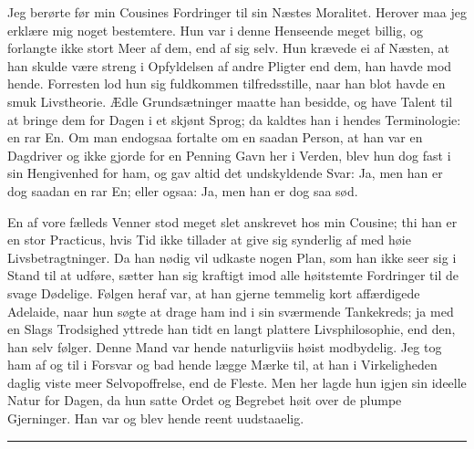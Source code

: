 \documentclass[12pt]{article}
\newcommand{\opage}[1]{\marginnote{\footnotesize\textit{[#1]}}}
\newcommand{\qvbreak}{\par\medskip\begin{center}\rule{0.32\textwidth}{0.4pt}\end{center}\medskip}
\begin{document}
Jeg berørte før min Cousines Fordringer til sin Næstes Moralitet. Herover maa jeg
erklære mig noget bestemtere. Hun var i denne Henseende meget billig, og
forlangte ikke stort Meer af dem, end af sig selv. Hun krævede ei af Næsten, at
han \opage{8}skulde være streng i Opfyldelsen af andre Pligter end dem, han havde
mod hende. Forresten lod hun sig fuldkommen tilfredsstille, naar han blot havde
en smuk Livstheorie. Ædle Grundsætninger maatte han besidde, og have Talent til
at bringe dem for Dagen i et skjønt Sprog; da kaldtes han i hendes Terminologie:
en rar En. Om man endogsaa fortalte om en saadan Person, at han var en Dagdriver
og ikke gjorde for en Penning Gavn her i Verden, blev hun dog fast i sin
Hengivenhed for ham, og gav altid det undskyldende Svar: Ja, men han er dog
saadan en rar En; eller ogsaa: Ja, men han er dog saa sød.

En af vore fælleds Venner stod meget slet anskrevet hos min Cousine; thi han er
en stor Practicus, hvis Tid ikke tillader at give sig synderlig af med høie
Livsbetragtninger. Da han nødig vil udkaste nogen Plan, som han ikke seer sig i
Stand til at udføre, sætter han sig kraftigt imod alle høitstemte Fordringer til
de svage Dødelige. Følgen heraf var, at han gjerne temmelig kort affærdigede
Adelaide, naar hun søgte at drage ham ind i sin sværmende Tankekreds; ja med en
Slags Trodsighed yttrede han tidt en langt plattere Livsphilosophie, end den, han
selv følger. Denne Mand var hende naturligviis høist modbydelig. Jeg tog ham af
og til i Forsvar og bad hende lægge Mærke til, at han i Virkeligheden daglig viste
meer Selvopoffrelse, end de Fleste. Men her lagde hun igjen sin ideelle Natur for
Dagen, da hun satte Ordet og Begrebet høit over de plumpe Gjerninger. Han var og
blev hende reent uudstaaelig.

\qvbreak
\end{document}
